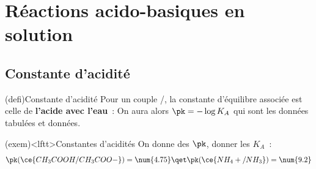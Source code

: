 \documentclass[../../main/main.tex]{subfiles}
\begin{document}
\section{Réactions acido-basiques en solution}
\subsection{Constante d'acidité}
\begin{tcb*}(defi){Constante d'acidité}
	Pour un couple /, la constante d'équilibre associée est celle de
	\textbf{l'acide avec l'eau}~:
	On aura alors $\pk = - \log K_A$ qui sont les données tabulées et
	données.
\end{tcb*}
\begin{tcb*}(exem)<lftt>{Constantes d'acidités}
	On donne des $\pk$, donner les $K_A$~:
	\[
		\pk(\ce{CH_3COOH/CH_3COO-}) = \num{4.75}
		\qet
		\pk(\ce{NH_4+/NH_3}) = \num{9.2}
	\]
	\tcblower
	\psw{
		\[
			K_A(\ce{CH_3COOH/CH_3COO-}) = 10^{-\num{4.75}}
			\qet
			K_A(\ce{NH_4+/NH_3}) = 10^{-\num{9.2}}
		\]
	}
	\vspace{-15pt}
\end{tcb*}
\end{document}

